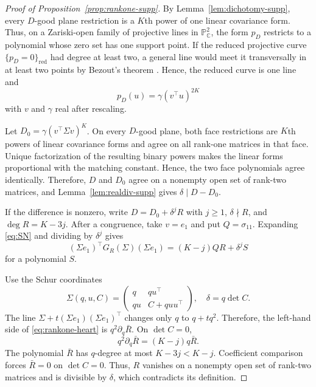 \documentclass[12pt,a4paper]{article}
\theoremstyle{plain}
\theoremstyle{definition}
\newcommand{\C}{\mathbb{C}}
\begin{document}
\begin{proof}[Proof of Proposition~\ref{prop:rankone-supp}]
    By Lemma~\ref{lem:dichotomy-supp}, every $D$-good plane restriction is a $K$th power of one linear covariance form.
    Thus, on a Zariski-open family of projective lines in $\mathbb{P}^2_\C$, the form $p_D$ restricts to a polynomial whose zero set has one support point.
    If the reduced projective curve $\{p_D=0\}_{\mathrm{red}}$ had degree at least two, a general line would meet it transversally in at least two points by Bezout's theorem \citep{harris1992}.
    Hence, the reduced curve is one line and
    \begin{equation*}
        p_D(u)
        =
        \gamma(v^\top u)^{2K}
    \end{equation*}
    with $v$ and $\gamma$ real after rescaling.
    
    Let $D_0=\gamma(v^\top\Sigma v)^K$.
    On every $D$-good plane, both face restrictions are $K$th powers of linear covariance forms and agree on all rank-one matrices in that face.
    Unique factorization of the resulting binary powers makes the linear forms proportional with the matching constant.
    Hence, the two face polynomials agree identically.
    Therefore, $D$ and $D_0$ agree on a nonempty open set of rank-two matrices, and Lemma~\ref{lem:realdiv-supp} gives $\delta\mid D-D_0$.

    If the difference is nonzero, write $D=D_0+\delta^jR$ with $j\ge1$, $\delta\nmid R$, and $\deg R=K-3j$.
    After a congruence, take $v=e_1$ and put $Q=\sigma_{11}$.
    Expanding \eqref{eq:SN} and dividing by $\delta^j$ gives
    \begin{equation}
    \label{eq:rankone-heart}
        (\Sigma e_1)^\top G_R(\Sigma)(\Sigma e_1)
        =
        (K-j)QR+\delta^jS
    \end{equation}
    for a polynomial $S$.

    Use the Schur coordinates
    \begin{equation*}
        \Sigma(q,u,C)
        =
        \begin{pmatrix}q&qu^\top\\qu&C+quu^\top\end{pmatrix}
        ,
        \quad
        \delta=q\det C
        .
    \end{equation*}
    The line $\Sigma+t(\Sigma e_1)(\Sigma e_1)^\top$ changes only $q$ to $q+tq^2$.
    Therefore, the left-hand side of \eqref{eq:rankone-heart} is $q^2\partial_q\bar R$.
    On $\det C=0$,
    \begin{equation*}
        q^2\partial_q\bar{R}
        =
        (K-j)q\bar{R}
        .
    \end{equation*}
    The polynomial $\bar{R}$ has $q$-degree at most $K-3j<K-j$.
    Coefficient comparison forces $\bar{R}=0$ on $\det C=0$.
    Thus, $R$ vanishes on a nonempty open set of rank-two matrices and is divisible by $\delta$, which contradicts its definition.
\end{proof}
\end{document}
